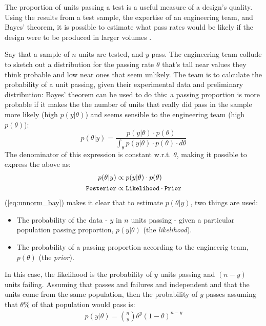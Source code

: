 \documentclass[11pt,a4paper,article]{memoir} %
\begin{document}
\par
The proportion of units passing a test is a useful measure of a design's quality. Using the results from a test sample, the expertise of an engineering team, and Bayes' theorem, it is possible to estimate what pass rates would be likely if the design were to be produced in larger volumes \cite{gelman2013bayesian}.
\par
Say that a sample of $n$ units are tested, and $y$ pass. The engineering team collude to sketch out a distribution for the passing rate $\theta$ that's tall near values they think probable and low near ones that seem unlikely. The team is to calculate the probability of a unit passing, given their experimental data and preliminary distribution: Bayes' theorem can be used to do this: a passing proportion is more probable if it makes the the number of units that really did pass in the sample more likely (high $p(y|\theta)$) and seems sensible to the engineering team (high $p(\theta)$):
\begin{equation}
  p(\theta|y) = \frac{p(y|\theta)\cdot p(\theta)}{\int_{\theta}p(y|\theta)\cdot p(\theta)\cdot d\theta}
  \label{eq:bayes}
\end{equation}
 The denominator of this expression is constant w.r.t. $\theta$, making it possible to express the above as:
\begin{align}
  p(\theta|y) &\propto p(y | \theta)\cdot p(\theta)   \label{eq:unnorm_bay} \\
  \small{\texttt{Posterior}} &\propto\small{{\texttt{Likelihood} \cdot \texttt{Prior}}} \nonumber
\end{align}
(\ref{eq:unnorm_bay}) makes it clear that to estimate $p(\theta|y)$, two things are used:
\begin{itemize}
\item The probability of the data - $y$ in $n$ units passing - given a particular population passing proportion, $p(y|\theta)$ (the \emph{likelihood}).
\item  The probability of a passing proportion according to the engineerig team, $p(\theta)$ (the \emph{prior}).
\end{itemize}
In this case, the likelihood is the probability of $y$ units passing and $(n-y)$ units failing. Assuming that passes and failures and independent and that the units come from the same population, then the probability of $y$ passes assuming that $\theta\%$ of that population would pass is:
\begin{gather}
  p(y|\theta) = \binom{n}{y} \theta^y (1 - \theta)^{n - y}
  \label{eq:binom_likelihood}
\end{gather}
\end{document}
